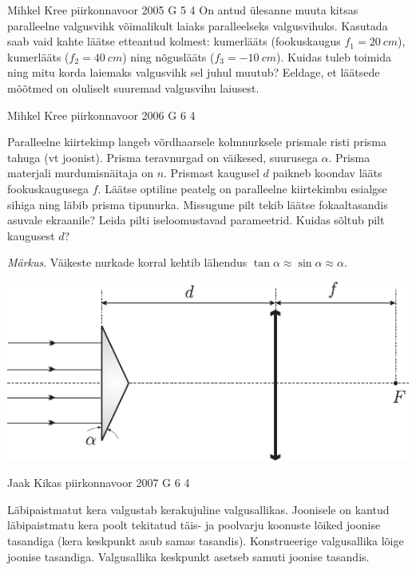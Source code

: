 \documentclass[11pt]{article}
\begin{document}
{%
{Mihkel Kree} %
{piirkonnavoor} %
{2005} %
{G 5} %
{4} %
{
\ifStatement
On antud ülesanne muuta kitsas paralleelne valgusvihk võimalikult laiaks paralleelseks valgusvihuks. Kasutada saab vaid kahte läätse etteantud kolmest: kumerlääts (fookuskaugus $f_1 = \SI{20}{cm}$), kumerlääts ($f_2 = \SI{40}{cm}$) ning nõguslääts ($f_3 = \SI{-10}{cm}$). Kuidas tuleb toimida ning mitu korda laiemaks valgusvihk sel juhul muutub? Eeldage, et läätsede mõõtmed on oluliselt suuremad valgusvihu laiusest.
\fi
}

{Mihkel Kree} %
{piirkonnavoor} %
{2006} %
{G 6} %
{4} %
{
\ifStatement
Paralleelne kiirtekimp langeb võrdhaarsele kolmnurksele prismale risti prisma tahuga (vt joonist). Prisma teravnurgad on väikesed, suurusega $\alpha$. Prisma materjali murdumisnäitaja on $n$. Prismast kaugusel $d$ paikneb koondav lääts fookuskaugusega $f$. Läätse optiline peatelg on paralleelne kiirtekimbu esialgse sihiga ning läbib prisma tipunurka. Missugune pilt tekib läätse fokaaltasandis asuvale ekraanile? Leida pilti iseloomustavad parameetrid. Kuidas sõltub pilt kaugusest $d$? 

\emph{Märkus}. Väikeste nurkade korral kehtib lähendus $\tan \alpha \approx \sin \alpha \approx \alpha$.

\begin{center}
	\includegraphics[width=\linewidth]{2006-v2g-06-yl}
\end{center}
\fi
}

{Jaak Kikas} %
{piirkonnavoor} %
{2007} %
{G 6} %
{4} %
{
\ifStatement
Läbipaistmatut kera valgustab kerakujuline valgusallikas. Joonisele on kantud läbipaistmatu kera poolt tekitatud täis- ja poolvarju koonuste lõiked joonise tasandiga (kera keskpunkt asub samas tasandis). Konstrueerige valgusallika lõige joonise tasandiga. Valgusallika keskpunkt asetseb samuti joonise tasandis.

}}
\end{document}
